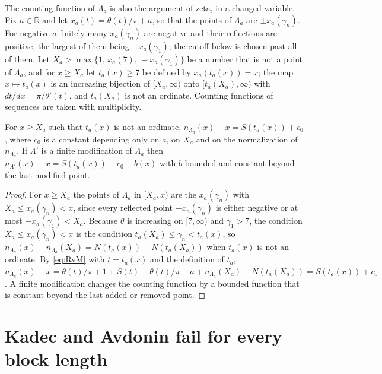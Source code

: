 \documentclass[11pt]{article}
\newcommand{\R}{\mathbb{R}}
\newcommand{\Lam}{\Lambda}
\begin{document}
The counting function of $\Lam_a$ is also the argument of zeta, in a changed variable. Fix $a\in\R$ and let $x_a(t)=\theta(t)/\pi+a$, so that the points of $\Lam_a$ are $\pm x_a(\gamma_n)$. For negative $a$ finitely many $x_a(\gamma_n)$ are negative and their reflections are positive, the largest of them being $-x_a(\gamma_1)$; the cutoff below is chosen past all of them. Let $X_a>\max\{1,\,x_a(7),\,-x_a(\gamma_1)\}$ be a number that is not a point of $\Lam_a$, and for $x\ge X_a$ let $t_a(x)\ge7$ be defined by $x_a(t_a(x))=x$; the map $x\mapsto t_a(x)$ is an increasing bijection of $[X_a,\infty)$ onto $[t_a(X_a),\infty)$ with $dt/dx=\pi/\theta'(t)$, and $t_a(X_a)$ is not an ordinate. Counting functions of sequences are taken with multiplicity.

\begin{lemma}\label{lem:counting}
For $x\ge X_a$ such that $t_a(x)$ is not an ordinate, $n_{\Lam_a}(x)-x=S(t_a(x))+c_0$, where $c_0$ is a constant depending only on $a$, on $X_a$ and on the normalization of $n_{\Lam_a}$. If $\Lam'$ is a finite modification of $\Lam_a$ then $n_{\Lam'}(x)-x=S(t_a(x))+c_0+b(x)$ with $b$ bounded and constant beyond the last modified point.
\end{lemma}

\begin{proof}
For $x\ge X_a$ the points of $\Lam_a$ in $[X_a,x)$ are the $x_a(\gamma_n)$ with $X_a\le x_a(\gamma_n)<x$, since every reflected point $-x_a(\gamma_n)$ is either negative or at most $-x_a(\gamma_1)<X_a$. Because $\theta$ is increasing on $[7,\infty)$ and $\gamma_1>7$, the condition $X_a\le x_a(\gamma_n)<x$ is the condition $t_a(X_a)\le\gamma_n<t_a(x)$, so $n_{\Lam_a}(x)-n_{\Lam_a}(X_a)=N(t_a(x))-N(t_a(X_a))$ when $t_a(x)$ is not an ordinate. By \eqref{eq:RvM} with $t=t_a(x)$ and the definition of $t_a$, $n_{\Lam_a}(x)-x=\theta(t)/\pi+1+S(t)-\theta(t)/\pi-a+n_{\Lam_a}(X_a)-N(t_a(X_a))=S(t_a(x))+c_0$. A finite modification changes the counting function by a bounded function that is constant beyond the last added or removed point.
\end{proof}

\section{Kadec and Avdonin fail for every block length}\label{sec:kadec}
\end{document}
